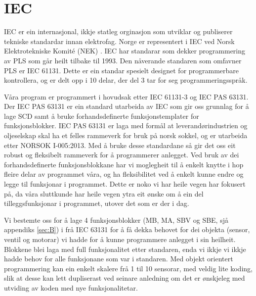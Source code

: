 \section{IEC}
\thispagestyle{fancy}


\gls{IEC} \citep{IEC} er ein internasjonal, ikkje statleg orginasjon som utviklar og publiserer tekniske standardar innan elektrofag. 
Norge er representert i IEC ved Norsk Elektrotekniske Komité (NEK) \citep{IEC-SNL}. 
IEC har standarar som dekker programmering av PLS som går heilt tilbake til 1993\citep{Wiki-93}. 
Den nåverande standaren som omfavner PLS er IEC 61131\citep{IEC-61131}. Dette er ein standar spesielt designet for programmerbare kontrollera, og er delt opp i 10 delar, der del 3 tar for seg programmeringsspråk. 

Våra program er programmert i hovudsak etter IEC 61131-3 og IEC \gls{PAS} 63131\citep{IEC-63131}. 
Der IEC PAS 63131 er ein standard utarbeida av IEC som gir oss grunnlag for å lage \gls{SCD} samt å bruke forhandsdefinerte funksjonstemplater for funksjonsblokker. 
IEC PAS 63131 er laga med formål at leverandørindustrien og oljeselskap skal ha et felles rammeverk for bruk på norsk sokkel, og er utarbeida etter NORSOK I-005:2013.
Med å bruke desse standardane så gir det oss eit robust og fleksibelt rammeverk for å programmerer anlegget. 
Ved bruk av dei forhandsdefinerte funksjonsblokkane har vi moglegheit til å enkelt knytte i hop fleire delar av programmet våra, og ha fleksibilitet ved å enkelt kunne endre og legge til funksjonar i programmet. 
Dette er noko vi har heile vegen har fokusert på, da våra sluttkunde har heile vegen ytra eit ønske om å ein del tilleggsfunksjonar i programmet, utover det som er der i dag. 

Vi bestemte oss for å lage 4 funksjonsblokker (MB, MA, SBV og SBE, sjå appendiks \ref{sec:B}) i frå IEC 63131 for å få dekka behovet for dei objekta (sensor, ventil og motorar) vi hadde for å kunne programmere anlegget i sin heilheit. 
Blokkene blei laga med full funksjonalitet etter standaren, enda vi ikkje vi ikkje hadde behov for  alle funksjonane som var i standaren. Med objekt orientert programmering kan ein enkelt skalere frå 1 til 10 sensorar, med veldig lite koding, slik at desse kan lett dupliserast ved seinare anledning om det er ønskjeleg med utviding av koden med nye funksjonalitetar. 

\newpage
